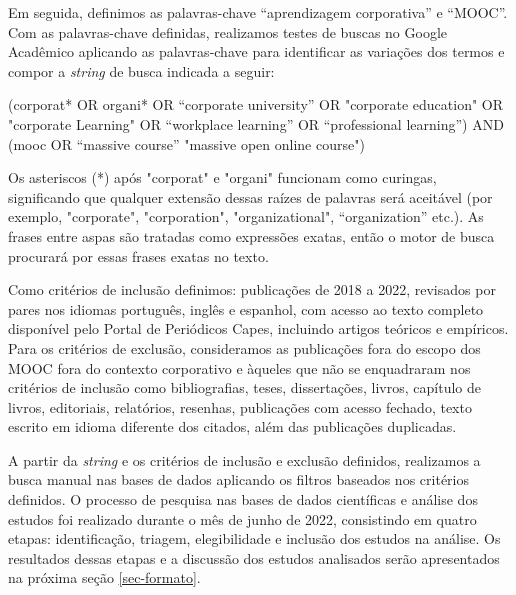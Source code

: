\documentclass[portuguese]{textolivre}
\begin{document}
Em seguida, definimos as palavras-chave “aprendizagem corporativa” e “MOOC”. Com as palavras-chave definidas, realizamos testes de buscas no Google Acadêmico aplicando as palavras-chave para identificar as variações dos termos e compor a \textit{string} de busca indicada a seguir: 

(corporat* OR organi* OR “corporate university” OR  "corporate education"  OR  "corporate Learning" OR “workplace learning” OR “professional learning”)  AND  (mooc  OR “massive course” "massive open online course")

Os asteriscos (*) após "corporat" e "organi" funcionam como curingas, significando que qualquer extensão dessas raízes de palavras será aceitável (por exemplo, "corporate", "corporation", "organizational", “organization” etc.). As frases entre aspas são tratadas como expressões exatas, então o motor de busca procurará por essas frases exatas no texto.

Como critérios de inclusão definimos: publicações de 2018 a 2022, revisados por pares nos idiomas português, inglês e espanhol, com acesso ao texto completo disponível pelo Portal de Periódicos Capes, incluindo artigos teóricos e empíricos. Para os critérios de exclusão, consideramos as publicações fora do escopo dos MOOC fora do contexto corporativo e àqueles que não se enquadraram nos critérios de inclusão como bibliografias, teses, dissertações, livros, capítulo de livros, editoriais, relatórios, resenhas, publicações com acesso fechado, texto escrito em idioma diferente dos citados, além das publicações duplicadas.  

A partir da \textit{string} e os critérios de inclusão e exclusão definidos, realizamos a busca manual nas bases de dados aplicando os filtros baseados nos critérios definidos. O processo de pesquisa nas bases de dados científicas e análise dos estudos foi realizado durante o mês de junho de 2022, consistindo em quatro etapas: identificação, triagem, elegibilidade e inclusão dos estudos na análise.   Os resultados dessas etapas e a discussão dos estudos analisados serão apresentados na próxima seção \ref{sec-formato}.
\end{document}
